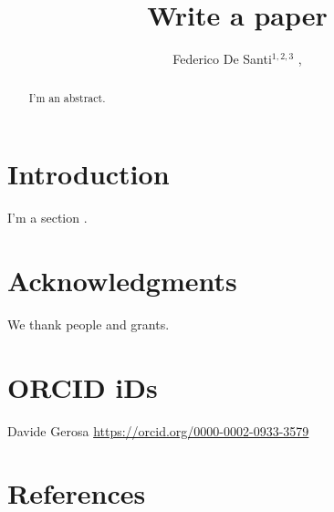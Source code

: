 \documentclass[]{iopart}
\newcommand{\milan}{{Dipartimento di Fisica ``G. Occhialini'', Universit\'a degli Studi di Milano-Bicocca, Piazza della Scienza 3, 20126 Milano, Italy}}
\newcommand{\infn}{{INFN, Sezione di Milano-Bicocca, Piazza della Scienza 3, 20126 Milano, Italy}}
\begin{document}
\begin{center}
\title[F.~De Santi et al.]{Write a paper}
\end{center}

\author{
Federico De Santi$^{1,2,3}$ ,
}
\vspace{0.1cm}
\address{$^{1}$~\milan}
\address{$^{2}$~\infn}


\setcounter{footnote}{0}


\begin{abstract}
I'm an abstract. 
\end{abstract}


\section{Introduction}

I'm a section \cite{2016PhRvL.116f1102A}.



\section*{Acknowledgments}

We thank people and grants.

\section*{ORCID iDs}
Davide Gerosa  \href{https://orcid.org/0000-0002-0933-3579}{https://orcid.org/0000-0002-0933-3579} \\


\section*{References}


\end{document}
